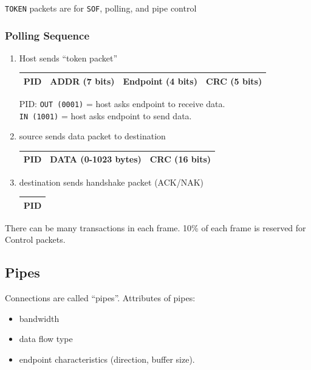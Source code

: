 {\tt TOKEN} packets are for {\tt SOF}, polling,  and pipe control

\subsubsection{Polling Sequence}

\begin{enumerate}
     \item Host sends ``token packet''  \\
     \begin{tabular}{|c|c|c|c|}
       \hline
        PID  &  ADDR (7 bits)  & Endpoint (4 bits) & CRC (5 bits)\\
       \hline
     \end{tabular}

     PID: {\tt OUT (0001)} = host asks endpoint to receive data.\\
     {\tt IN (1001)} = host asks endpoint to send data.

     \item source sends data packet to destination\\
     \begin{tabular}{|c|c|c|}
       \hline
        PID  & DATA (0-1023 bytes)  &  CRC (16 bits)\\
       \hline
     \end{tabular}


     \item destination sends handshake packet (ACK/NAK) \\
    \begin{tabular}{|c|}
       \hline
        PID  \\
       \hline
     \end{tabular}

\end{enumerate}

There can be many transactions in each frame.   10\%
of each frame is reserved for Control packets.

\subsection{Pipes}
Connections are called ``pipes''.  Attributes of pipes:
\begin{itemize}
     \item bandwidth
     \item data flow  type
     \item endpoint characteristics (direction, buffer
     size).
\end{itemize}

